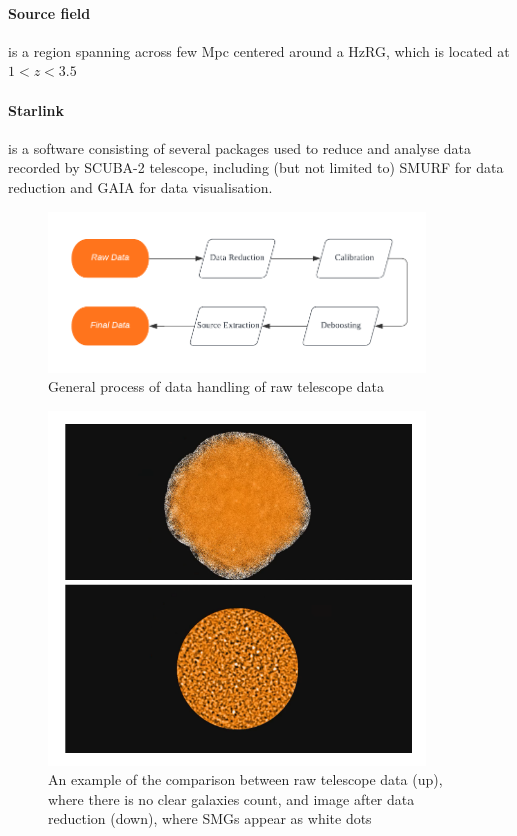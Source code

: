 \documentclass{article}
\begin{document}
\paragraph{Source field}is a region spanning across few Mpc centered around a HzRG, which is located at $1 < z < 3.5$ 

\paragraph{Starlink}is a software consisting of several packages used to reduce and analyse data recorded by SCUBA-2 telescope, including (but not limited to) SMURF for data reduction and GAIA for data visualisation.

\begin{figure}
    \centering
    \includegraphics[width=100mm]{Flowchart.png}
    \caption{General process of data handling of raw telescope data}
    \label{fig:flowchart1}
\end{figure}

\begin{figure}
    \centering
    \includegraphics[width=100mm]{reducevsunreduce.png}
    \caption{An example of the comparison between raw telescope data (up), where there is no clear galaxies count, and image after data reduction (down), where SMGs appear as white dots}
    \label{fig:reducevsunreduce}
\end{figure}
\end{document}
